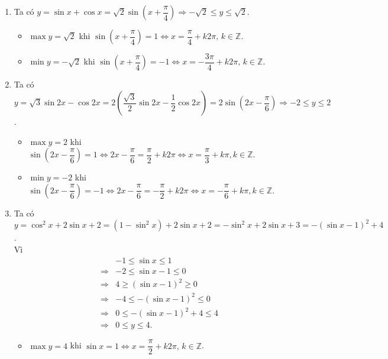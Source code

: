 \begin{ex}
{\begin{enumerate}
\begin{itemize}
				\item $\max y=2\sqrt{2}-3$ khi  $\cos x=1\Leftrightarrow x=k2\pi,\,k\in\mathbb{Z}$.
				\item  $\min y=-3$ khi $\cos x=-1\Leftrightarrow x=\pi+k2\pi,\,k\in\mathbb{Z}$.
			\end{itemize}
			\item Ta  có $y=\sin x+\cos x=\sqrt{2}\sin\left(x+\dfrac{\pi}{4}\right)\Rightarrow-\sqrt{2}\leq y\leq\sqrt{2}$.
			\begin{itemize}
				\item $\max y=\sqrt{2}$ khi $\sin\left(x+\dfrac{\pi}{4}\right)=1\Leftrightarrow x=\dfrac{\pi}{4}+k2\pi,\,k\in\mathbb{Z}$. 
				\item  $\min y=-\sqrt{2}$ khi $\sin\left(x+\dfrac{\pi}{4}\right)=-1\Leftrightarrow x=-\dfrac{3\pi}{4}+k2\pi,\,k\in\mathbb{Z}$.
			\end{itemize}
			\item Ta  có $y=\sqrt{3}\sin 2x-\cos 2x=2\left(\dfrac{\sqrt{3}}{2}\sin 2x-\dfrac{1}{2}\cos 2x\right)=2\sin\left(2x-\dfrac{\pi}{6}\right)\Rightarrow-2\leq y\leq 2$.
			\begin{itemize}
				\item $\max y=2$ khi $\sin\left(2x-\dfrac{\pi}{6}\right)=1\Leftrightarrow 2x-\dfrac{\pi}{6}=\dfrac{\pi}{2}+k2\pi\Leftrightarrow x=\dfrac{\pi}{3}+k\pi,  k\in\mathbb{Z}$.
				\item $\min y=-2$  khi $\sin\left(2x-\dfrac{\pi}{6}\right)=-1\Leftrightarrow 2x-\dfrac{\pi}{6}=-\dfrac{\pi}{2}+k2\pi\Leftrightarrow x=-\dfrac{\pi}{6}+k\pi, k\in\mathbb{Z}$.
			\end{itemize}
			\item Ta có 
			$y=\cos^2x+2\sin x+2=(1-\sin^2x)+2\sin x+2=-\sin^2x+2\sin x+3=-(\sin x-1)^2+4$.\\ 
			Vì  \allowdisplaybreaks
			\begin{eqnarray*}
				&&-1 \leq \sin x  \leq 1\\
				& \Rightarrow& -2 \leq \sin  x - 1 \leq 0 \\
				&\Rightarrow& 4 \geq (\sin x - 1)^2 \geq  0\\
				 &\Rightarrow &-4 \leq -(\sin x - 1)^2 \leq 0 \\
				&\Rightarrow& 0 \leq -(\sin x  - 1)^2 + 4 \leq 4 \\
				&\Rightarrow& 0 \leq y \leq  4.
			\end{eqnarray*}
			\begin{itemize}
				\item $\max y=4$ khi $\sin  x=1\Leftrightarrow x=\dfrac{\pi}{2}+k2\pi,\,k\in\mathbb{Z}$.

\end{itemize}
\end{enumerate}}
\end{ex}
